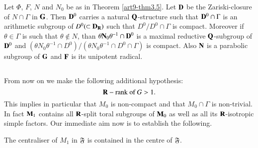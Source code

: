 \setcounter{proposition}{7}
\begin{proposition}\label{art9-prop3.8}
Let $\Phi$, $F$, $N$ and $N_0$ be as in Theorem \ref{art9-thm3.5}. Let $\mathbf{D}$  be the Zariski-closure of $N \cap \Gamma$ in $\mathbf{G}$. Then $\mathbf{D}^0$ carries a natural $\mathbf{Q}$-structure such that $\mathbf{D}^0 \cap \Gamma$ is an arithmetic subgroup of $D^0 (\subset \mathbf{D}_{\mathbf{R}})$ such that $D^0/ D^0 \cap \Gamma$ is compact. Moreover if $\theta \in \Gamma$ is such that $\theta \not\in N$, than $\theta \mathbf{N}_0 \theta^{-1} \cap \mathbf{D}^0$ is a maximal reductive $\mathbf{Q}$-subgroup of $\mathbf{D}^0$ and $(\theta N_0 \theta^{-1} \cap D^0)/ (\theta N_0 \theta^{-1} \cap D^0 \cap \Gamma)$ is compact. Also $\mathbf{N}$ is a parabolic subgroup of $\mathbf{G}$ and $\mathbf{F}$ is its unipotent radical.
\end{proposition}

\setcounter{subsection}{8}
\subsection{}\label{subsec3.9}
From now on we make the following additional hypothesis:
$$
\mathbf{R}-\text{rank of } G > 1. 
$$
This implies in particular that $M_0$ is non-compact and that $M_0 \cap \Gamma$ is non-trivial. In fact $\mathbf{M}_1$ contains all $\mathbf{R}$-split toral subgroups of $\mathbf{M}_0$ as well as all its $\mathbf{R}$-isotropic simple factors. Our immediate aim now is to establish the following.

\setcounter{proposition}{9}
\begin{proposition}\label{art9-prop3.10}
The centraliser of $M_1$ in $\mathfrak{F}$ is  contained in the centre of $\mathfrak{F}$.
\end{proposition}

\setcounter{subsection}{10}
